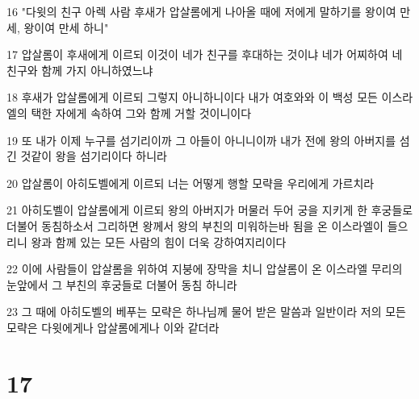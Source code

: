\par 16 "다윗의 친구 아렉 사람 후새가 압살롬에게 나아올 때에 저에게 말하기를 왕이여 만세, 왕이여 만세 하니"
\par 17 압살롬이 후새에게 이르되 이것이 네가 친구를 후대하는 것이냐 네가 어찌하여 네 친구와 함께 가지 아니하였느냐
\par 18 후새가 압살롬에게 이르되 그렇지 아니하니이다 내가 여호와와 이 백성 모든 이스라엘의 택한 자에게 속하여 그와 함께 거할 것이니이다
\par 19 또 내가 이제 누구를 섬기리이까 그 아들이 아니니이까 내가 전에 왕의 아버지를 섬긴 것같이 왕을 섬기리이다 하니라
\par 20 압살롬이 아히도벨에게 이르되 너는 어떻게 행할 모략을 우리에게 가르치라
\par 21 아히도벨이 압살롬에게 이르되 왕의 아버지가 머물러 두어 궁을 지키게 한 후궁들로 더불어 동침하소서 그리하면 왕께서 왕의 부친의 미워하는바 됨을 온 이스라엘이 들으리니 왕과 함께 있는 모든 사람의 힘이 더욱 강하여지리이다
\par 22 이에 사람들이 압살롬을 위하여 지붕에 장막을 치니 압살롬이 온 이스라엘 무리의 눈앞에서 그 부친의 후궁들로 더불어 동침 하니라
\par 23 그 때에 아히도벨의 베푸는 모략은 하나님께 물어 받은 말씀과 일반이라 저의 모든 모략은 다윗에게나 압살롬에게나 이와 같더라

\chapter{17}

